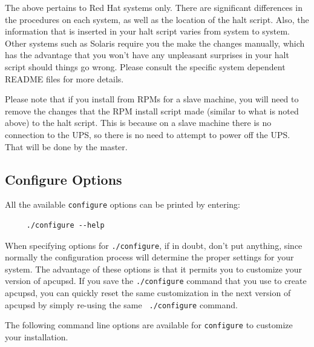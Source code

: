The above pertains to Red Hat systems only. There are significant differences
in the procedures on each system, as well as the location of the halt script.
Also, the information that is inserted in your halt script varies from system
to system. Other systems such as Solaris require you the make the changes
manually, which has the advantage that you won't have any unpleasant surprises
in your halt script should things go wrong. Please consult the specific system
dependent README files for more details.  

Please note that if you install from RPMs for a slave machine, you will need
to remove the changes that the RPM install script made (similar to what is
noted above) to the halt script. This is because on a slave machine there is
no connection to the UPS, so there is no need to attempt to power off the UPS.
That will be done by the master. 

\label{Configure-Options}

\subsection*{Configure Options}

\label{index-configure-options-24}
\label{index-options_002c-configure-25}
All the available {\tt configure} options can be printed by entering: 

\footnotesize
\begin{verbatim}
     ./configure --help
\end{verbatim}
\normalsize

When specifying options for {\tt ./configure}, if in doubt, don't put
anything, since normally the configuration process will determine the proper
settings for your system. The advantage of these options is that it permits
you to customize your version of apcupsd.  If you save the {\tt ./configure}
command that you use to create apcupsd, you can quickly reset the same
customization in the next version of apcupsd by simply re-using the same {\tt
./configure} command.  

The following command line options are available for {\tt configure} to
customize your installation. 
\label{index-options_002c-_002d_002d_002dprefix-26}

